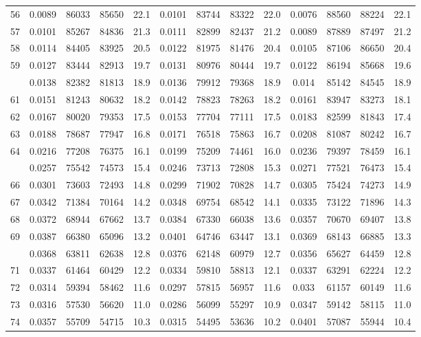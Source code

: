 \documentclass[
  14pt,
]{article}
\begin{document}
\begin{longtable}[t]{lcccccccccccc}
56 & 0.0089 & 86033 & 85650 & 22.1 & 0.0101 & 83744 & 83322 & 22.0 & 0.0076 & 88560 & 88224 & 22.1\\
57 & 0.0101 & 85267 & 84836 & 21.3 & 0.0111 & 82899 & 82437 & 21.2 & 0.0089 & 87889 & 87497 & 21.2\\
58 & 0.0114 & 84405 & 83925 & 20.5 & 0.0122 & 81975 & 81476 & 20.4 & 0.0105 & 87106 & 86650 & 20.4\\
59 & 0.0127 & 83444 & 82913 & 19.7 & 0.0131 & 80976 & 80444 & 19.7 & 0.0122 & 86194 & 85668 & 19.6\\
\addlinespace
60 & 0.0138 & 82382 & 81813 & 18.9 & 0.0136 & 79912 & 79368 & 18.9 & 0.014 & 85142 & 84545 & 18.9\\
61 & 0.0151 & 81243 & 80632 & 18.2 & 0.0142 & 78823 & 78263 & 18.2 & 0.0161 & 83947 & 83273 & 18.1\\
62 & 0.0167 & 80020 & 79353 & 17.5 & 0.0153 & 77704 & 77111 & 17.5 & 0.0183 & 82599 & 81843 & 17.4\\
63 & 0.0188 & 78687 & 77947 & 16.8 & 0.0171 & 76518 & 75863 & 16.7 & 0.0208 & 81087 & 80242 & 16.7\\
64 & 0.0216 & 77208 & 76375 & 16.1 & 0.0199 & 75209 & 74461 & 16.0 & 0.0236 & 79397 & 78459 & 16.1\\
\addlinespace
65 & 0.0257 & 75542 & 74573 & 15.4 & 0.0246 & 73713 & 72808 & 15.3 & 0.0271 & 77521 & 76473 & 15.4\\
66 & 0.0301 & 73603 & 72493 & 14.8 & 0.0299 & 71902 & 70828 & 14.7 & 0.0305 & 75424 & 74273 & 14.9\\
67 & 0.0342 & 71384 & 70164 & 14.2 & 0.0348 & 69754 & 68542 & 14.1 & 0.0335 & 73122 & 71896 & 14.3\\
68 & 0.0372 & 68944 & 67662 & 13.7 & 0.0384 & 67330 & 66038 & 13.6 & 0.0357 & 70670 & 69407 & 13.8\\
69 & 0.0387 & 66380 & 65096 & 13.2 & 0.0401 & 64746 & 63447 & 13.1 & 0.0369 & 68143 & 66885 & 13.3\\
\addlinespace
70 & 0.0368 & 63811 & 62638 & 12.8 & 0.0376 & 62148 & 60979 & 12.7 & 0.0356 & 65627 & 64459 & 12.8\\
71 & 0.0337 & 61464 & 60429 & 12.2 & 0.0334 & 59810 & 58813 & 12.1 & 0.0337 & 63291 & 62224 & 12.2\\
72 & 0.0314 & 59394 & 58462 & 11.6 & 0.0297 & 57815 & 56957 & 11.6 & 0.033 & 61157 & 60149 & 11.6\\
73 & 0.0316 & 57530 & 56620 & 11.0 & 0.0286 & 56099 & 55297 & 10.9 & 0.0347 & 59142 & 58115 & 11.0\\
74 & 0.0357 & 55709 & 54715 & 10.3 & 0.0315 & 54495 & 53636 & 10.2 & 0.0401 & 57087 & 55944 & 10.4\\

\end{longtable}
\end{document}
